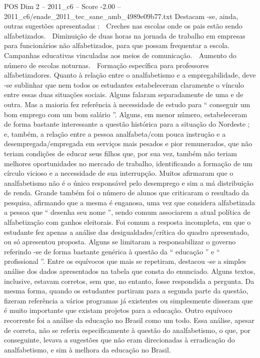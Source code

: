 \begin{textsample}{POS Dim 2 – 2011\_c6 – Score -2.00 – 2011\_c6/enade\_2011\_tec\_sane\_amb\_4989e09b77.txt}
Destacam -se, ainda, outras sugestões apresentadas :  Creches nas escolas onde os pais estão sendo alfabetizados.  Diminuição de duas horas na jornada de trabalho em empresas para funcionários não alfabetizados, para que possam frequentar a escola.  Campanhas educativas vinculadas aos meios de comunicação.  Aumento do número de escolas noturnas.  Formação específica para professores alfabetizadores.
Quanto à relação entre o analfabetismo e a empregabilidade, deve -se sublinhar que nem todos os estudantes estabeleceram claramente o vínculo entre essas duas situações sociais.
Alguns falaram separadamente de uma e de outra.
Mas a maioria fez referência à necessidade de estudo para “ conseguir um bom emprego com um bom salário ”.
Alguns, em menor número, estabeleceram de forma bastante interessante a questão histórica para a situação do Nordeste ; e, também, a relação entre a pessoa analfabeta/com pouca instrução e a desempregada/empregada em serviços mais pesados e pior remunerados, que não teriam condições de educar seus filhos que, por sua vez, também não teriam melhores oportunidades no mercado de trabalho, identificando a formação de um círculo vicioso e a necessidade de sua interrupção.
Muitos afirmaram que o analfabetismo não é o único responsável pelo desemprego e sim a má distribuição de renda.
Grande também foi o número de alunos que criticaram o resultado da pesquisa, afirmando que a mesma é enganosa, uma vez que considera alfabetizada a pessoa que “ desenha seu nome ”, sendo comum associarem a atual política de alfabetização com ganhos eleitorais.
Foi comum a resposta incompleta, em que o estudante fez apenas a análise das desigualdades/crítica do quadro apresentado, ou só apresentou proposta.
Alguns se limitaram a responsabilizar o governo referindo -se de forma bastante genérica à questão da “ educação ” e “ profissional ”.
Entre os equívocos que mais se repetiram, destacou -se a simples análise dos dados apresentados na tabela que consta do enunciado.
Alguns textos, inclusive, estavam corretos, sem que, no entanto, fosse respondida a pergunta.
Da mesma forma, quando os estudantes partiram para a segunda parte da questão, fizeram referência a vários programas já existentes ou simplesmente disseram que é muito importante que existam projetos para a educação.
Outro equívoco recorrente foi a análise da educação no Brasil como um todo.
Essa análise, apesar de correta, não se referia especificamente à questão do analfabetismo, o que, por conseguinte, levava a sugestões que não eram direcionadas à erradicação do analfabetismo, e sim à melhora da educação no Brasil.

\end{textsample}
